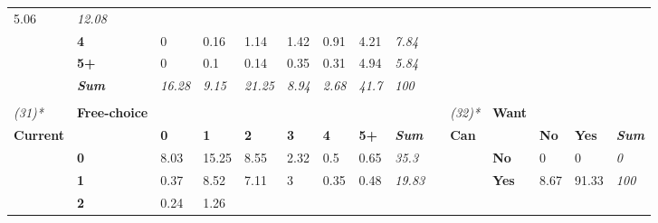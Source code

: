 {\begin{center}
\begin{longtable}{lllllllllllllll}
  \cellcolor[HTML]{E4E4E4}5.06 &
  \textit{12.08} &
   &
   &
   &
   &
   &
  \textit{} \\
 &
  \textbf{4} &
  \cellcolor[HTML]{FFFFFF}0 &
  \cellcolor[HTML]{FFFFFF}0.16 &
  \cellcolor[HTML]{F9F9F9}1.14 &
  \cellcolor[HTML]{F8F8F8}1.42 &
  \cellcolor[HTML]{FBFBFB}0.91 &
  \cellcolor[HTML]{E8E8E8}4.21 &
  \textit{7.84} &
   &
   &
   &
   &
   &
  \textit{} \\
 &
  \textbf{5+} &
  \cellcolor[HTML]{FFFFFF}0 &
  \cellcolor[HTML]{FFFFFF}0.1 &
  \cellcolor[HTML]{FFFFFF}0.14 &
  \cellcolor[HTML]{FEFEFE}0.35 &
  \cellcolor[HTML]{FEFEFE}0.31 &
  \cellcolor[HTML]{E4E4E4}4.94 &
  \textit{5.84} &
   &
   &
   &
   &
   &
  \textit{} \\
\textit{} &
  \textit{\textbf{Sum}} &
  \textit{16.28} &
  \textit{9.15} &
  \textit{21.25} &
  \textit{8.94} &
  \textit{2.68} &
  \textit{41.7} &
  \textit{100} &
  \textit{} &
  \textit{} &
  \textit{} &
  \textit{} &
  \textit{} &
  \textit{} \\
\textit{} &
  \textit{\textbf{}} &
  \textit{} &
  \textit{} &
  \textit{} &
  \textit{} &
  \textit{} &
  \textit{} &
  \textit{} &
  \textit{} &
  \textit{} &
  \textit{} &
  \textit{} &
  \textit{} &
  \textit{} \\
\textit{(31)*} &
  \textbf{Free-choice} &
   &
   &
   &
   &
   &
   &
  \textit{} &
   &
  \textit{(32)*} &
  \textbf{Want} &
   &
   &
  \textit{} \\
\textbf{Current} &
   &
  \textbf{0} &
  \textbf{1} &
  \textbf{2} &
  \textbf{3} &
  \textbf{4} &
  \textbf{5+} &
  \textit{\textbf{Sum}} &
  \textbf{} &
  \textbf{Can} &
   &
  \textbf{No} &
  \textbf{Yes} &
  \textit{\textbf{Sum}} \\
 &
  \textbf{0} &
  \cellcolor[HTML]{D1D1D1}8.03 &
  \cellcolor[HTML]{A6A6A6}15.25 &
  \cellcolor[HTML]{CECECE}8.55 &
  \cellcolor[HTML]{F2F2F2}2.32 &
  \cellcolor[HTML]{FDFDFD}0.5 &
  \cellcolor[HTML]{FCFCFC}0.65 &
  \textit{35.3} &
   &
   &
  \textbf{No} &
  \cellcolor[HTML]{FFFFFF}0 &
  \cellcolor[HTML]{FFFFFF}0 &
  \textit{0} \\
 &
  \textbf{1} &
  \cellcolor[HTML]{FDFDFD}0.37 &
  \cellcolor[HTML]{CECECE}8.52 &
  \cellcolor[HTML]{D6D6D6}7.11 &
  \cellcolor[HTML]{EEEEEE}3 &
  \cellcolor[HTML]{FDFDFD}0.35 &
  \cellcolor[HTML]{FDFDFD}0.48 &
  \textit{19.83} &
   &
   &
  \textbf{Yes} &
  \cellcolor[HTML]{F7F7F7}8.67 &
  \cellcolor[HTML]{A6A6A6}91.33 &
  \textit{100} \\
 &
  \textbf{2} &
  \cellcolor[HTML]{FEFEFE}0.24 &
  \cellcolor[HTML]{F8F8F8}1.26 &

\end{longtable}
\end{center}}
